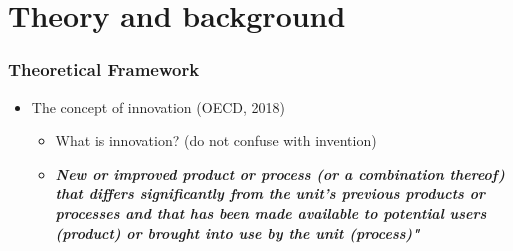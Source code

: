 \documentclass{beamer}
\begin{document}
\section{Theory and background}
	\begin{frame}[allowframebreaks]
		\frametitle{Theoretical Framework}
		\begin{itemize}
			\item The concept of innovation (OECD, 2018)
			\begin{itemize}
				\item What is innovation?  (do not confuse with invention)
				
				\item \textit{\textbf{New or improved product or process (or a combination thereof) that differs significantly from the unit's previous
				products or processes and that has been made available to potential users (product) or brought into use by the unit (process)"	}}
				

\end{itemize}
\end{itemize}
\end{frame}
\end{document}
